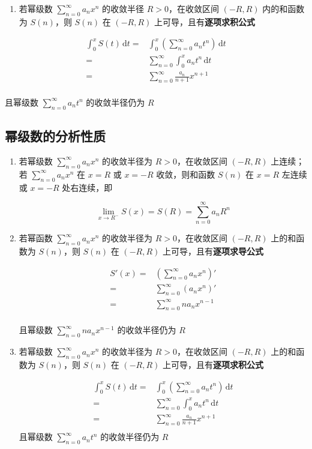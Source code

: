 \documentclass[lang = zh , final , oneside , openany , titlepage , zihao = -4 , linespread = 1.3 , baselineskip = false , cjk-font = windows , text-font = newtx , math-font = newtx , math-style = ISO , uppercase-greek = upright , integral-limits = false]{sjtureport}
\begin{document}
\begin{enumerate}
\item
  若幂级数 \(\displaystyle \sum_{n=0}^\infty a_nx^n\) 的收敛半径
  \(R>0\)，在收敛区间 \((-R,R)\) 内的和函数为 \(S(n)\)，则 \(S(n)\) 在
  \((-R,R)\) 上可导，且有\textbf{逐项求积公式}
\end{enumerate}

\[\begin{aligned}
  \int_0^xS(t)\,\mathrm{d}t = &\int_0^x\left(\sum_{n=0}^\infty a_nt^n\right)\,\mathrm{d}t\\
    = &\sum_{n=0}^\infty \int_0^x a_nt^n\,\mathrm{d}t\\
    = &\sum_{n=0}^\infty \frac{a_n}{n+1}x^{n+1}\\
  \end{aligned}\]

且幂级数 \(\displaystyle \sum_{n=0}^\infty a_nt^n\) 的收敛半径仍为 \(R\)

\subsection{幂级数的分析性质}

\begin{enumerate}
    \item 若幂级数 \(\displaystyle \sum_{n=0}^\infty a_nx^n\) 的收敛半径为
\(R>0\)，在收敛区间 \((-R,R)\) 上连续；若
\(\displaystyle\sum_{n=0}^\infty a_nx^n\) 在 \(x=R\) 或 \(x=-R\)
收敛，则和函数 \(S(n)\) 在 \(x=R\) 左连续或 \(x=-R\) 处右连续，即

\[\displaystyle \lim_{x\to R^-}S(x)=S(R)=\sum_{n=0}^\infty a_nR^n\]

    \item 若幂函数 \(\displaystyle \sum_{n=0}^\infty a_nx^n\) 的收敛半径为
\(R>0\)，在收敛区间 \((-R,R)\) 上的和函数为 \(S(n)\)，则 \(S(n)\) 在
\((-R,R)\) 上可导，且有\textbf{逐项求导公式}

\[\begin{aligned}
S'(x) = &\left(\sum_{n=0}^\infty a_nx^n\right)'\\
  = &\sum_{n=0}^\infty \left(a_nx^n\right)'\\
  = &\sum_{n=0}^\infty na_nx^{n-1}\\
\end{aligned}\]

且幂级数 \(\displaystyle \sum_{n=0}^\infty na_nx^{n-1}\) 的收敛半径仍为
\(R\)

    \item 若幂级数 \(\displaystyle \sum_{n=0}^\infty a_nx^n\) 的收敛半径为
\(R>0\)，在收敛区间 \((-R,R)\) 上的和函数为 \(S(n)\)，则 \(S(n)\) 在
\((-R,R)\) 上可导，且有\textbf{逐项求积公式}

\[\begin{aligned}
\int_0^xS(t)\,\mathrm{d}t = &\int_0^x\left(\sum_{n=0}^\infty a_nt^n\right)\,\mathrm{d}t\\
  = &\sum_{n=0}^\infty \int_0^x a_nt^n\,\mathrm{d}t\\
  = &\sum_{n=0}^\infty \frac{a_n}{n+1}x^{n+1}\\
\end{aligned}
\]
且幂级数 \(\displaystyle \sum_{n=0}^\infty a_nt^n\) 的收敛半径仍为 \(R\)
\end{enumerate}
\end{document}
